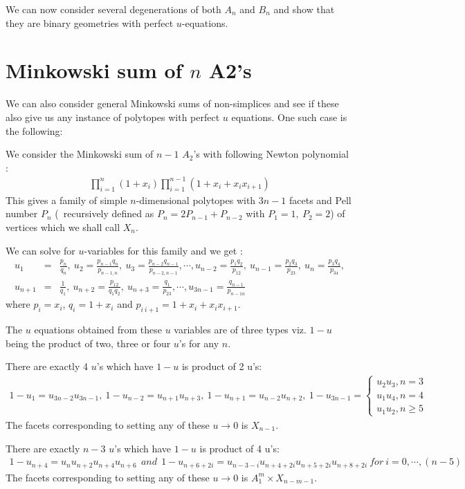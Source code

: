 \documentclass[hidelinks,12pt]{article}
\newcommand{\bea}[1]{\begin{eqnarray}\label{#1} }
\newcommand{\eea}{\end{eqnarray}}
\def\bea{\begin{eqnarray}}
\def\eea{\end{eqnarray}}
\begin{document}
\begin{enumerate}
We can now consider several degenerations of both $A_n$ and $B_n$ and show that they are binary geometries with perfect $u$-equations.
\newpage
\section*{Minkowski sum of $n$ A2's }
We can also consider general Minkowski sums of non-simplices and see if these also give us any instance of polytopes with perfect $u$ equations. One such case is the following:

We consider the Minkowski sum of $n-1$ $A_2$'s with following Newton polynomial :
\bea \label {new}
\prod_{i=1}^{n} (1+x_i ) \prod_{i=1}^{n-1} (1+x_i +x_i x_{i+1}) 
\eea 
This gives a family of simple $n$-dimensional polytopes with $3n-1$ facets  and Pell number $P_n$ (~recursively defined as $ P_n=2 P_{n-1} +P_{n-2}$ with $P_1=1,~ P_2=2$) of vertices which we shall call $X_n$. 

We can solve for $u$-variables for this family and we get :
\bea
u_1 &=& \frac{p_n}{q_n}, ~u_2 = \frac{p_{n-1}q_n}{p_{n-1,n}},~u_3 = \frac{p_{n-2}q_{n-1}}{p_{n-2,n-1}}, \cdots,
u_{n-2} = \frac{p_1 q_2}{p_{12}}, ~u_{n-1} = \frac{p_{2}q_3}{p_{23}},~u_n = \frac{p_{3}q_{4}}{p_{34}}, \nonumber \\
u_{n+1} &=& \frac{1}{q_1}, ~u_{n+2} = \frac{p_{12}}{q_{1}q_{2}},~u_{n+3} = \frac{q_{1}}{p_{23}}, \cdots,
u_{3n-1} = \frac{ q_{n-1}}{p_{n-1n}} \nonumber
\eea
where $p_i =x_i$, $q_i= 1+x_i$ and $p_{i~i+1}=1+x_i+ x_i x_{i+1}$.

The $u$ equations obtained from these $u$ variables are of three types viz. $1-u$ being the product of two, three or four $u$'s  for any $n$.  

There are exactly 4 $u$'s which have $1-u$ is product of 2 u's:
\bea
1-u_{1} =u_{3n-2} u_{3n-1},~
1-u_{n-2} =u_{n+1} u_{n+3},~
1-u_{n+1} =u_{n-2} u_{n+2},~
1-u_{3n-1} = \begin{cases}
u_{2} u_{3} , n=3\\
u_{1} u_{4} , n=4\\
u_{1} u_{2} , n\geq 5
\end{cases} \nonumber 
\eea
The facets corresponding to setting any of these $u \to 0$ is $X_{n-1}$.

There are exactly $n-3$ $u$'s which have $1-u$ is product of 4 u's:
\bea
1-u_{n+4} =u_{n} u_{n+2}u_{n+4} u_{n+6} ~~and~~
1-u_{n+6+ 2 i} =u_{n-3-i} u_{n+4+2 i} u_{n+5+2 i} u_{n+8+2 i}~ for~i=0,\cdots,(n-5) \nonumber 
\eea
The facets corresponding to setting any of these $u \to 0$ is $A^{m}_1 \times X_{n-m-1}$.


\end{enumerate}
\end{document}
